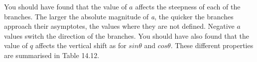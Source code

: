  \label{m39414*id90781}You should have found that the value of \begin{math}a\end{math} affects the steepness of each of the branches. The larger the absolute magnitude of \textsl{a}, the quicker the branches approach their asymptotes, the values where they are not defined. Negative \begin{math}\mathit{a}\end{math} values switch the direction of the branches.
You should have also found that the value of \begin{math}q\end{math} affects the vertical shift as for \begin{math}sin\theta \end{math} and \begin{math}cos\theta \end{math}.
These different properties are summarised in Table 14.12.\par 
        
    
      
    
    \setlength\mytablespace{6\tabcolsep}
    \addtolength\mytablespace{4\arrayrulewidth}
    \setlength\mytablewidth{\linewidth}
        
    
    \setlength\mytableroom{\mytablewidth}
    \addtolength\mytableroom{-\mytablespace}
    
    \setlength\myfixedwidth{0pt}
    \setlength\mystarwidth{\mytableroom}
        \addtolength\mystarwidth{-\myfixedwidth}
        \divide{}
        
    
            
    
